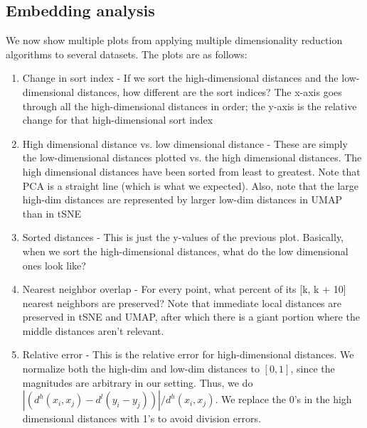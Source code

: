 \documentclass{article}
\theoremstyle{definition}
\begin{document}
\begin{multicols}{2}
\subsection{Embedding analysis}
We now show multiple plots from applying multiple dimensionality reduction algorithms to several datasets. The plots are as follows:
\begin{enumerate}
    \item Change in sort index - If we sort the high-dimensional distances and the low-dimensional distances, how different are the sort indices? The x-axis
        goes through all the high-dimensional distances in order; the y-axis is the relative change for that high-dimensional sort index
    \item High dimensional distance vs. low dimensional distance - These are simply the low-dimensional distances plotted vs. the high dimensional distances. The high dimensional distances
        have been sorted from least to greatest. Note that PCA is a straight line (which is what we expected). Also, note that the large high-dim distances are
        represented by larger low-dim distances in UMAP than in tSNE
    \item Sorted distances - This is just the y-values of the previous plot. Basically, when we sort the high-dimensional distances, what do the low
        dimensional ones look like?
    \item Nearest neighbor overlap - For every point, what percent of its [k, k + 10] nearest neighbors are preserved? Note that immediate local distances are preserved in
        tSNE and UMAP, after which there is a giant portion where the middle distances aren't relevant.
    \item Relative error - This is the relative error for high-dimensional distances. We normalize both the high-dim and low-dim distances to $[0, 1]$, since the
        magnitudes are arbitrary in our setting. Thus, we do $| (d^h(x_i, x_j) - d^l(y_i - y_j)) |/ d^h(x_i, x_j)$. We replace the 0's in the high dimensional
        distances with 1's to avoid division errors.
\end{enumerate}


\end{multicols}
\end{document}
